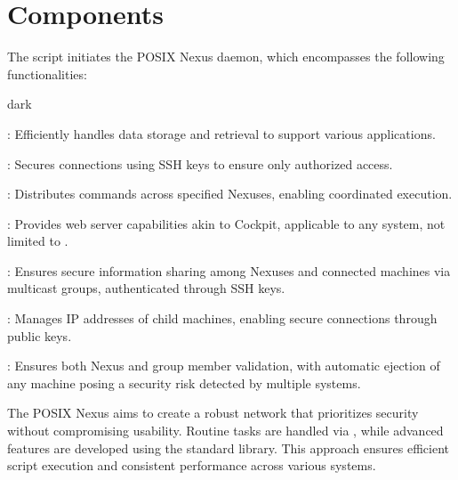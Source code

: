 \section{Components}
\label{sec:component}
The  script initiates the POSIX Nexus daemon, which encompasses the following functionalities:
\bigskip
\begin{baseBoxOne}{}{dark}
    \begin{posnexItemize}
        \item[\sA] : Efficiently handles data storage and retrieval to support various applications.
        \item[\sA] : Secures connections using SSH keys to ensure only authorized access.
        \item[\sA] : Distributes commands across specified Nexuses, enabling coordinated execution.
        \item[\sA] : Provides web server capabilities akin to Cockpit, applicable to any system, not limited to .
        \item[\sA] : Ensures secure information sharing among Nexuses and connected machines via multicast groups, authenticated through SSH keys.
        \item[\sA] : Manages IP addresses of child machines, enabling secure connections through public keys.
        \item[\sA] : Ensures both Nexus and group member validation, with automatic ejection of any machine posing a security risk detected by multiple systems.
    \end{posnexItemize}
\end{baseBoxOne}
\bigskip
The POSIX Nexus aims to create a robust network that prioritizes security without compromising usability.
Routine tasks are handled via , while advanced features are developed using the  standard library.
This approach ensures efficient script execution and consistent performance across various systems.


















